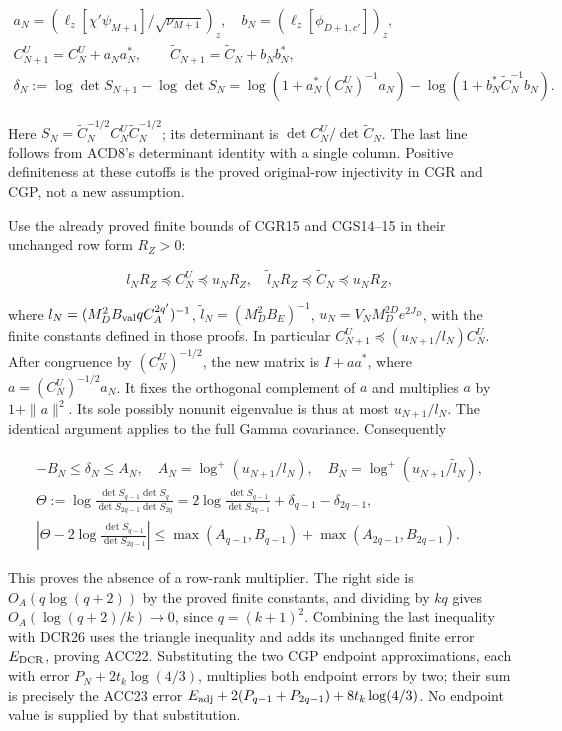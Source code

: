 \documentclass[11pt]{article}
\begin{document}
\[
\begin{gathered}
a_N=(\ell_z[\chi'\psi_{M+1}]/\sqrt{\nu_{M+1}})_z,
\quad b_N=(\ell_z[\phi_{D+1,c'}])_z,\\
C_{N+1}^U=C_N^U+a_Na_N^*,\qquad
\widetilde C_{N+1}=\widetilde C_N+b_Nb_N^*,\\
\delta_N:=\log\det S_{N+1}-\log\det S_N
=\log(1+a_N^*(C_N^U)^{-1}a_N)
-\log(1+b_N^*\widetilde C_N^{-1}b_N).
\end{gathered}\tag{ACD14}
\]

Here \(S_N=\widetilde C_N^{-1/2}C_N^U\widetilde C_N^{-1/2}\); its determinant is \(\det C_N^U/\det\widetilde C_N\). The last line follows from ACD8's determinant identity with a single column. Positive definiteness at these cutoffs is the proved original-row injectivity in CGR and CGP, not a new assumption.

Use the already proved finite bounds of CGR15 and CGS14--15 in their unchanged row form \(R_Z>0\):

\[
l_NR_Z\preceq C_N^U\preceq u_NR_Z,\quad
\widetilde l_NR_Z\preceq\widetilde C_N\preceq u_NR_Z,
\]

where \(l_N=(M_D^2B_{\rm val}qC_A^{2q'})^{-1}\), \(\widetilde l_N=(M_D^2B_E)^{-1}\), \(u_N=V_NM_D^{2D}e^{2J_D}\), with the finite constants defined in those proofs. In particular \(C_{N+1}^U\preceq(u_{N+1}/l_N)C_N^U\). After congruence by \((C_N^U)^{-1/2}\), the new matrix is \(I+aa^*\), where \(a=(C_N^U)^{-1/2}a_N\). It fixes the orthogonal complement of \(a\) and multiplies \(a\) by \(1+\|a\|^2\). Its sole possibly nonunit eigenvalue is thus at most \(u_{N+1}/l_N\). The identical argument applies to the full Gamma covariance. Consequently

\[
\begin{gathered}
-B_N\le\delta_N\le A_N,\quad
A_N=\log^+(u_{N+1}/l_N),\quad
B_N=\log^+(u_{N+1}/\widetilde l_N),\\
\Theta:=\log\frac{\det S_{q-1}\det S_q}{\det S_{2q-1}\det S_{2q}}
=2\log\frac{\det S_{q-1}}{\det S_{2q-1}}+\delta_{q-1}-\delta_{2q-1},\\
\left|\Theta-2\log\frac{\det S_{q-1}}{\det S_{2q-1}}\right|
\le\max(A_{q-1},B_{q-1})+\max(A_{2q-1},B_{2q-1}).
\end{gathered}\tag{ACD15}
\]

This proves the absence of a row-rank multiplier. The right side is \(O_A(q\log(q+2))\) by the proved finite constants, and dividing by \(kq\) gives \(O_A(\log(q+2)/k)\to0\), since \(q=(k+1)^2\). Combining the last inequality with DCR26 uses the triangle inequality and adds its unchanged finite error \(E_{\rm DCR}\), proving ACC22. Substituting the two CGP endpoint approximations, each with error \(P_N+2t_k\log(4/3)\), multiplies both endpoint errors by two; their sum is precisely the ACC23 error \(E_{\rm adj}+2(P_{q-1}+P_{2q-1})+8t_k\log(4/3)\). No endpoint value is supplied by that substitution.
\end{document}

